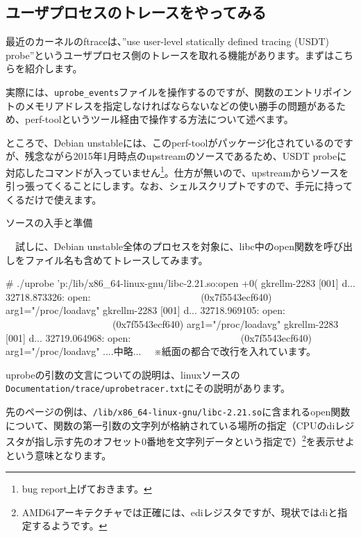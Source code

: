 \documentclass[mingoth,a4paper]{jsarticle}
\begin{document}
\subsection{ユーザプロセスのトレースをやってみる}

  最近のカーネルのftraceは、''use user-level statically defined tracing (USDT) probe''というユーザプロセス側のトレースを取れる機能があります。まずはこちらを紹介します。

  実際には、\verb+uprobe_events+ファイルを操作するのですが、関数のエントリポイントのメモリアドレスを指定しなければならないなどの使い勝手の問題があるため、perf-toolというツール経由で操作する方法について述べます。

  
 ところで、Debian unstableには、このperf-toolがパッケージ化されているのですが、残念ながら2015年1月時点のupstreamのソースであるため、USDT probeに対応したコマンドが入っていません\footnote{bug report上げておきます。}。仕方が無いので、upstreamからソースを引っ張ってくることにします。なお、シェルスクリプトですので、手元に持ってくるだけで使えます。
  
  
 ソースの入手と準備
   
　試しに、Debian unstable全体のプロセスを対象に、libc中のopen関数を呼び出しをファイル名も含めてトレースしてみます。

 \begin{commandline}
   # ./uprobe 'p:/lib/x86_64-linux-gnu/libc-2.21.so:open
   +0(%
   gkrellm-2283  [001] d... 32718.873326: open:
   　　　　　　　　　　　(0x7f5543ecf640) arg1="/proc/loadavg"
   gkrellm-2283  [001] d... 32718.969105: open:
   　　　　　　　　　　　(0x7f5543ecf640) arg1="/proc/loadavg"
   gkrellm-2283  [001] d... 32719.064968: open:
   　　　　　　　　　　　(0x7f5543ecf640) arg1="/proc/loadavg"
	 ....中略...
　※紙面の都合で改行を入れています。
 \end{commandline}
  

 uprobeの引数の文言についての説明は、linuxソースの\verb+Documentation/trace/uprobetracer.txt+にその説明があります。

 先のページの例は、\verb+/lib/x86_64-linux-gnu/libc-2.21.so+に含まれるopen関数について、関数の第一引数の文字列が格納されている場所の指定（CPUのdiレジスタが指し示す先のオフセット0番地を文字列データという指定で）\footnote{AMD64アーキテクチャでは正確には、ediレジスタですが、現状ではdiと指定するようです。}を表示せよという意味となります。
 
\end{document}
